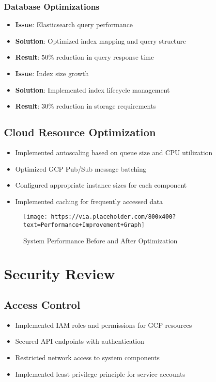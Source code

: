 \documentclass[12pt,a4paper]{report}
\begin{document}
\subsection{Database Optimizations}
\begin{itemize}
    \item \textbf{Issue}: Elasticsearch query performance
    \item \textbf{Solution}: Optimized index mapping and query structure
    \item \textbf{Result}: 50\% reduction in query response time
\end{itemize}

\begin{itemize}
    \item \textbf{Issue}: Index size growth
    \item \textbf{Solution}: Implemented index lifecycle management
    \item \textbf{Result}: 30\% reduction in storage requirements
\end{itemize}

\section{Cloud Resource Optimization}
\begin{itemize}
    \item Implemented autoscaling based on queue size and CPU utilization
    \item Optimized GCP Pub/Sub message batching
    \item Configured appropriate instance sizes for each component
    \item Implemented caching for frequently accessed data
\end{itemize}

\begin{figure}[H]
    \centering
    \texttt{[image: https://via.placeholder.com/800x400?text=Performance+Improvement+Graph]}
    \caption{System Performance Before and After Optimization}
\end{figure}

\chapter{Security Review}

\section{Access Control}
\begin{itemize}
    \item Implemented IAM roles and permissions for GCP resources
    \item Secured API endpoints with authentication
    \item Restricted network access to system components
    \item Implemented least privilege principle for service accounts
\end{itemize}
\end{document}
